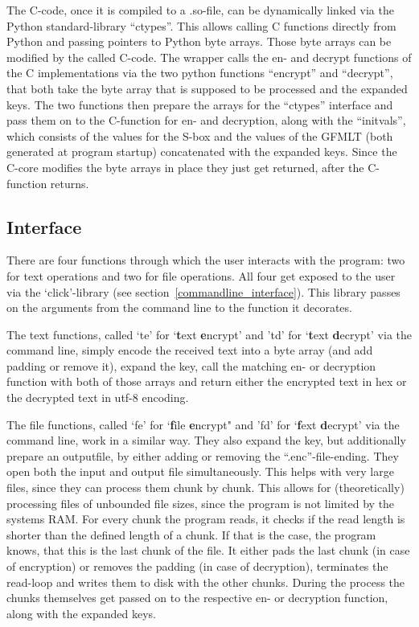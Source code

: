 The C-code, once it is compiled to a .so-file, can be dynamically linked
via the Python standard-library \enquote{ctypes}. This allows calling C functions
directly from Python and passing pointers to Python byte arrays. Those
byte arrays can be modified by the called C-code. The wrapper
calls the en- and decrypt functions of the C implementations via the two
python functions ``encrypt'' and ``decrypt'', that both take the byte
array that is supposed to be processed and the expanded keys. The two
functions then prepare the arrays for the \enquote{ctypes} interface and pass them
on to the C-function for en- and decryption, along with the \enquote{initvals},
which consists of the values for the S-box and the values of the GFMLT
(both generated at program startup) concatenated with the expanded keys.
Since the C-core modifies the byte arrays in place they just get
returned, after the C-function returns.

\hypertarget{interface}{%
\subsection{Interface}\label{interface}}

There are four functions through which the user interacts with the
program: two for text operations and two for file operations. All four
get exposed to the user via the `click'-library (see section~\ref{commandline_interface}). This library passes on the arguments
from the command line to the function it decorates.

The text functions, called `te' for `\textbf{t}ext \textbf{e}ncrypt' and
'td' for `\textbf{t}ext \textbf{d}ecrypt' via the command line, simply
encode the received text into a byte array (and add padding or remove
it), expand the key, call the matching en- or decryption function with
both of those arrays and return either the encrypted text in hex or the
decrypted text in utf-8 encoding.

The file functions, called `fe' for `\textbf{f}ile \textbf{e}ncrypt" and
'fd' for `\textbf{f}ext \textbf{d}ecrypt' via the command line, work in
a similar way. They also expand the key, but additionally prepare an
outputfile, by either adding or removing the ``.enc''-file-ending. They
open both the input and output file simultaneously. This helps with very
large files, since they can process them chunk by chunk. This allows for
(theoretically) processing files of unbounded file sizes, since the
program is not limited by the systems RAM. For every chunk the program
reads, it checks if the read length is shorter than the defined length
of a chunk. If that is the case, the program knows, that this is the
last chunk of the file. It either pads the last chunk (in case of
encryption) or removes the padding (in case of decryption), terminates
the read-loop and writes them to disk with the other chunks. During the
process the chunks themselves get passed on to the respective en- or
decryption function, along with the expanded keys.
